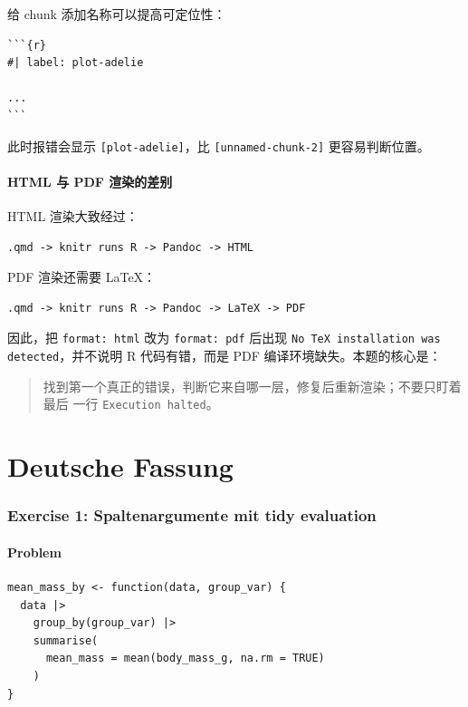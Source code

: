 \documentclass[11pt,a4paper]{ctexart}
\begin{document}
给 chunk 添加名称可以提高可定位性：

\begin{lstlisting}[style=textcode]
```{r}
#| label: plot-adelie

...
```
\end{lstlisting}

此时报错会显示 \lstinline|[plot-adelie]|，比
\lstinline|[unnamed-chunk-2]| 更容易判断位置。

\subsection{HTML 与 PDF 渲染的差别}

HTML 渲染大致经过：

\begin{lstlisting}[style=textcode]
.qmd -> knitr runs R -> Pandoc -> HTML
\end{lstlisting}

PDF 渲染还需要 LaTeX：

\begin{lstlisting}[style=textcode]
.qmd -> knitr runs R -> Pandoc -> LaTeX -> PDF
\end{lstlisting}

因此，把 \lstinline|format: html| 改为 \lstinline|format: pdf| 后出现
\lstinline|No TeX installation was detected|，并不说明 R 代码有错，而是
PDF 编译环境缺失。本题的核心是：

\begin{quote}
找到第一个真正的错误，判断它来自哪一层，修复后重新渲染；不要只盯着最后
一行 \texttt{Execution halted}。
\end{quote}

\newpage
\part{Deutsche Fassung}

\section{Exercise 1: Spaltenargumente mit tidy evaluation}

\subsection{Problem}

\begin{lstlisting}[style=rcode]
mean_mass_by <- function(data, group_var) {
  data |>
    group_by(group_var) |>
    summarise(
      mean_mass = mean(body_mass_g, na.rm = TRUE)
    )
}
\end{lstlisting}
\end{document}
